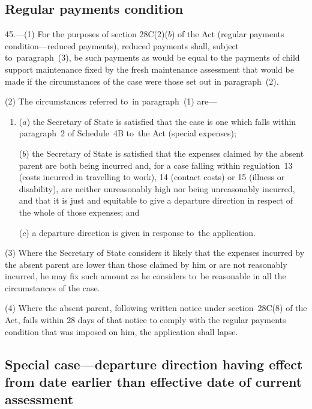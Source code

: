 \documentclass[12pt,a4paper]{article}
\begin{document}
\subsection[45. Regular payments condition]{Regular payments condition}

45.—(1) For the purposes of section
28C(2)($b$) of the Act (regular payments condition—reduced payments), reduced
payments shall, subject to~paragraph~(3), be such payments as would be equal to
the payments of child support maintenance fixed by the fresh maintenance
assessment that would be made if the circumstances of the case were those set
out in paragraph~(2).

(2) The circumstances referred to~in paragraph~(1) are—
\begin{enumerate}\item[]
($a$) the Secretary of State is satisfied that the case is one which falls within
paragraph~2 of Schedule~4B to~the Act (special expenses);

($b$) the Secretary of State is satisfied that the expenses claimed by the absent
parent are both being incurred and, for a case falling within regulation~13
(costs incurred in travelling to work), 14 (contact costs) or 15 (illness or
disability), are neither unreasonably high nor being unreasonably incurred, and
that it is just and equitable to give a departure direction in respect of the
whole of those expenses; and

($c$) a departure direction is given in response to~the application.
\end{enumerate}

(3) Where the Secretary of State considers it likely that the expenses incurred
by the absent parent are lower than those claimed by him or are not reasonably
incurred, he may fix such amount as he considers to~be reasonable in all the
circumstances of the case.

\begin{sloppypar}
(4) Where the absent parent, following written notice under section~28C(8) of
the Act, fails within 28 days of that notice to comply with the regular payments
condition that was imposed on him, the application shall lapse.
\end{sloppypar}

\subsection[46. Special case—departure direction having effect from date earlier than effective
date of current assessment]{\sloppy Special case—departure direction having effect from date earlier than effective
date of current assessment}
\end{document}
